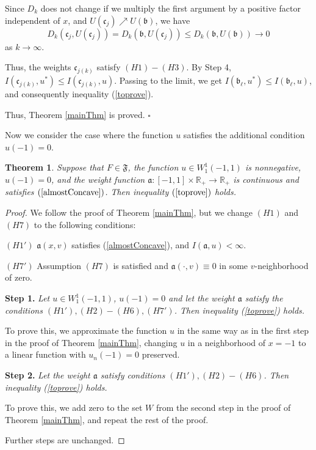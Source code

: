 \documentclass[12pt]{article}
\newcommand{\Real}{\mathbb R}
\renewcommand{\le}{\leqslant}
\newtheorem{thm}{Theorem}
\newcommand{\W}{W_1^1}
\begin{document}
Since $D_k$ does not change if we multiply the first argument by a positive factor independent of $x$,
and $U(\mathfrak c_j) \nearrow U(\mathfrak b)$, we have
$$D_k(\mathfrak c_j, U(\mathfrak c_j)) = D_k(\mathfrak b, U(\mathfrak c_j)) \le D_k(\mathfrak b, U(\mathfrak b)) \to 0$$
as $k \to \infty$.

Thus, the weights $\mathfrak c_{j(k)}$ satisfy $(H1)-(H3)$.
By Step 4, $I(\mathfrak c_{j(k)}, u^*) \le I(\mathfrak c_{j(k)}, u)$.
Passing to the limit, we get $I(\mathfrak b_{\ell}, u^*) \le I(\mathfrak b_{\ell}, u)$,
and consequently inequality (\ref{toprove}).

Thus, Theorem \ref{mainThm} is proved.
\hfill $\square$

\medskip

Now we consider the case where the function $u$ satisfies the additional condition $u(-1) = 0$.
\begin{thm}
Suppose that $F \in \mathfrak{F}$, the function $u \in \W(-1, 1)$ is nonnegative, $u(-1) = 0$,
and the weight function $\mathfrak a: [-1, 1] \times \Real_+ \to \Real_+$ is continuous
and satisfies $(\ref{almostConcave})$.
Then inequality $(\ref{toprove})$ holds.
\end{thm}

\begin{proof}
We follow the proof of Theorem \ref{mainThm},
but we change $(H1)$ and $(H7)$ to the following conditions:

\bigskip
\noindent
$(H1')$ $\mathfrak a(x, v)$ satisfies (\ref{almostConcave}), and $I(\mathfrak a, u) < \infty$.

\bigskip
\noindent
$(H7')$ Assumption $(H7)$ is satisfied and $\mathfrak a(\cdot, v) \equiv 0$ in some $v$-neighborhood of zero.

\bigskip
{\bf Step 1.} {\it Let $u \in \W(-1, 1)$, $u(-1) = 0$ and let the weight $\mathfrak a$ satisfy the conditions $(H1'), (H2)-(H6), (H7')$.
Then inequality (\ref{toprove}) holds.}

To prove this, we approximate the function $u$ in the same way as in the first step in the proof of Theorem \ref{mainThm},
changing $u$ in a neighborhood of $x = -1$ to a linear function with $u_n(-1) = 0$ preserved.

\bigskip
{\bf Step 2.} {\it Let the weight $\mathfrak a$ satisfy conditions $(H1'), (H2)-(H6)$.
Then inequality (\ref{toprove}) holds.}

To prove this, we add zero to the set $W$ from the second step in the proof of Theorem \ref{mainThm},
and repeat the rest of the proof.

\medskip

Further steps are unchanged.
\end{proof}
\end{document}
